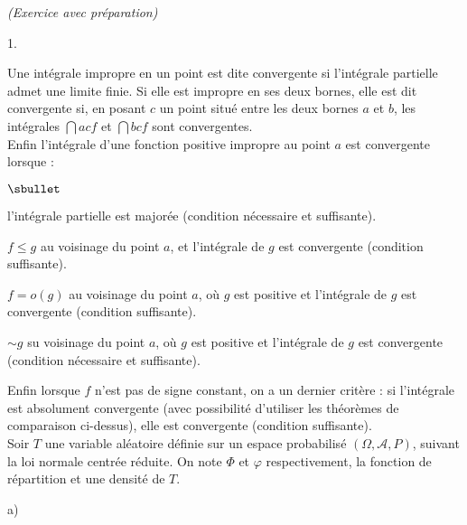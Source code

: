\documentclass[11pt]{article}%
\begin{document}
 \begin{exercice}{\it (Exercice avec préparation)}~
 \begin{noliste}{1.}
 \setlength{\itemsep}{4mm}
 \item Une intégrale impropre en un point est dite convergente si
l'intégrale partielle admet une limite finie. Si elle est impropre en
ses deux bornes, elle est dit convergente si, en posant $c$ un point
situé entre les deux bornes $a$ et $b$, les intégrales $\dint{a}{c} f$
et $\dint{b}{c} f$ sont convergentes. \\

 Enfin l'intégrale d'une fonction positive impropre au point $a$ est
convergente lorsque : \begin{noliste}{$\sbullet$}

 \item l'intégrale partielle est majorée (condition nécessaire et
suffisante). \\

 \item $f \leq g$ au voisinage du point $a$, et l'intégrale de $g$ est
convergente (condition suffisante). \\

 \item $ f = o(g)$ au voisinage du point $a$, où $g$ est positive et
l'intégrale de $g$ est convergente (condition suffisante). \\

 \item $ \sim g$ su voisinage du point $a$, où $g$ est positive et
l'intégrale de $g$ est convergente (condition nécessaire et
suffisante). \\

 \end{noliste}

 Enfin lorsque $f$ n'est pas de signe constant, on a un dernier critère
: si l'intégrale est absolument convergente (avec possibilité
d'utiliser les théorèmes de comparaison ci-dessus), elle est
convergente (condition suffisante). \\

 Soir $T$ une variable aléatoire définie sur un espace probabilisé
$(\Omega, \mathcal{A}, P)$, suivant la loi normale centrée réduite. On
note $\Phi$ et $\varphi$ respectivement, la fonction de répartition et
une densité de $T$. \\

 \item \begin{noliste}{a)}
 \setlength{\itemsep}{2mm}


\end{noliste}
\end{noliste}
\end{exercice}
\end{document}
